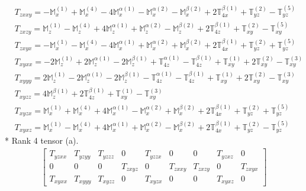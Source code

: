 \documentclass[fleqn,8pt,landscape]{jsarticle}
\begin{document}
\begin{align*}
& T_{zxxy} = - \mathbb{M}_{x}^{(1)} + \mathbb{M}_{x}^{(4)} - 4 \mathbb{M}_{x}^{\alpha(1)} - \mathbb{M}_{x}^{\alpha(2)} - \mathbb{M}_{x}^{\beta(2)} + 2 \mathbb{T}_{4x}^{\beta(1)} + \mathbb{T}_{yz}^{(2)} - \mathbb{T}_{yz}^{(5)} \\
& T_{zxzy} = \mathbb{M}_{z}^{(1)} - \mathbb{M}_{z}^{(4)} + 4 \mathbb{M}_{z}^{\alpha(1)} + \mathbb{M}_{z}^{\alpha(2)} - \mathbb{M}_{z}^{\beta(2)} + 2 \mathbb{T}_{4z}^{\beta(1)} + \mathbb{T}_{xy}^{(2)} - \mathbb{T}_{xy}^{(5)} \\
& T_{zxyx} = - \mathbb{M}_{x}^{(1)} - \mathbb{M}_{x}^{(4)} - 4 \mathbb{M}_{x}^{\alpha(1)} + \mathbb{M}_{x}^{\alpha(2)} + \mathbb{M}_{x}^{\beta(2)} + 2 \mathbb{T}_{4x}^{\beta(1)} + \mathbb{T}_{yz}^{(2)} + \mathbb{T}_{yz}^{(5)} \\
& T_{xyxx} = - 2 \mathbb{M}_{z}^{(1)} + 2 \mathbb{M}_{z}^{\alpha(1)} - 2 \mathbb{M}_{z}^{\beta(1)} + \mathbb{T}_{4z}^{\alpha(1)} - \mathbb{T}_{4z}^{\beta(1)} + \mathbb{T}_{xy}^{(1)} + 2 \mathbb{T}_{xy}^{(2)} - \mathbb{T}_{xy}^{(3)} \\
& T_{xyyy} = 2 \mathbb{M}_{z}^{(1)} - 2 \mathbb{M}_{z}^{\alpha(1)} - 2 \mathbb{M}_{z}^{\beta(1)} - \mathbb{T}_{4z}^{\alpha(1)} - \mathbb{T}_{4z}^{\beta(1)} + \mathbb{T}_{xy}^{(1)} + 2 \mathbb{T}_{xy}^{(2)} - \mathbb{T}_{xy}^{(3)} \\
& T_{xyzz} = 4 \mathbb{M}_{z}^{\beta(1)} + 2 \mathbb{T}_{4z}^{\beta(1)} + \mathbb{T}_{xy}^{(1)} - \mathbb{T}_{xy}^{(3)} \\
& T_{xyzx} = \mathbb{M}_{x}^{(1)} + \mathbb{M}_{x}^{(4)} + 4 \mathbb{M}_{x}^{\alpha(1)} - \mathbb{M}_{x}^{\alpha(2)} + \mathbb{M}_{x}^{\beta(2)} + 2 \mathbb{T}_{4x}^{\beta(1)} + \mathbb{T}_{yz}^{(2)} + \mathbb{T}_{yz}^{(5)} \\
& T_{xyxz} = \mathbb{M}_{x}^{(1)} - \mathbb{M}_{x}^{(4)} + 4 \mathbb{M}_{x}^{\alpha(1)} + \mathbb{M}_{x}^{\alpha(2)} - \mathbb{M}_{x}^{\beta(2)} + 2 \mathbb{T}_{4x}^{\beta(1)} + \mathbb{T}_{yz}^{(2)} - \mathbb{T}_{yz}^{(5)}
\end{align*}
* Rank 4 tensor (a).
\begin{align*}
\begin{bmatrix} T_{yzxx} & T_{yzyy} & T_{yzzz} & 0 & T_{yzzx} & 0 & 0 & T_{yzxz} & 0 \\ 0 & 0 & 0 & T_{zxyz} & 0 & T_{zxxy} & T_{zxzy} & 0 & T_{zxyx} \\ T_{xyxx} & T_{xyyy} & T_{xyzz} & 0 & T_{xyzx} & 0 & 0 & T_{xyxz} & 0 \end{bmatrix}
\end{align*}
\end{document}
